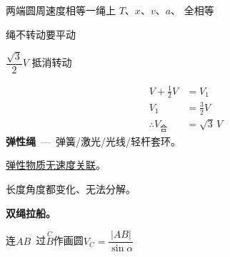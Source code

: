 \noindent 两端圆周速度相等\quad 一绳上 $T$、$x$、$v$、$a$、 全相等%

\noindent 绳不转动要平动

\noindent $\dfrac{\sqrt3}{2}V$ 抵消转动%

\begin{align*}
V+\tfrac12V&=V_1\\
V_1&=\tfrac32V\\
\therefore V_{\text{合}}&=\sqrt3\,V
\end{align*}
\textbf{弹性绳}\ —\ 弹簧/激光/光线/轻杆套环。


\noindent \underline{弹性物质无速度关联}。%

\begin{keybox}%
长度角度都变化、无法分解。
\end{keybox}
\textbf{双绳拉船。}

\noindent 连$AB$\ 过$\overset{C}{B}$作画圆\qquad $V_C=\dfrac{|AB|}{\sin\alpha}$%


